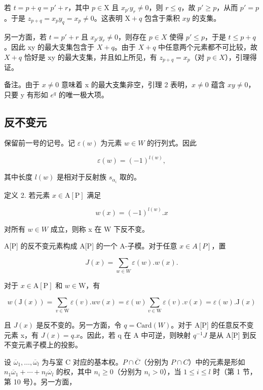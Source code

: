若 \(t = p + q = p' + r\)，其中 \(p \in \mathrm{X}\) 且 \(x_{p'}y_r \neq 0\)，则 \(r \leqslant q\)，故 \(p' \geqslant p\)，从而 \(p' = p\)。于是 \(z_{p + q} = x_p y_q = x_p \neq 0\)。这表明 \(\mathrm{X} + q\) 包含于乘积 \(xy\) 的支集。

另一方面，若 \(t = p' + r\) 且 \(x_{p'} y_r \neq 0\)，则存在 \(p \in X\) 使得 \(p' \leqslant p\)，于是 \(t \leqslant p + q\)。因此 xy 的最大支集包含于 \(X + q\)。由于 \(X + q\) 中任意两个元素都不可比较，故 \(X + q\) 恰好是 xy 的最大支集，并且如上所见，有 \(z_{p+q} = x_p\)（对 \(p \in X\)），引理得证。

备注。由于 \(x \neq 0\) 意味着 x 的最大支集非空，引理 2 表明，\(x \neq 0\) 蕴含 \(xy \neq 0\)，只要 y 有形如 \(e^{q}\) 的唯一极大项。

\subsection{反不变元}

保留前一号的记号。记 \(\varepsilon(w)\) 为元素 \(w \in W\) 的行列式。因此

\[
\varepsilon (w) = (- 1) ^ {l (w)},
\]

其中长度 \(l(w)\) 是相对于反射族 \(s_{\alpha_i}\) 取的。

定义 2. 若元素 \(x \in \mathrm{A}[\mathrm{P}]\) 满足

\[
w (x) = (- 1) ^ {l (w)}. x
\]

对所有 \(w \in W\) 成立，则称 x 在 W 下反不变。

A{[}P{]} 的反不变元素构成 A{[}P{]} 的一个 A-子模。对于任意 \(x \in A[P]\)，置

\[
J (x) = \sum_ {w \in W} \varepsilon (w). w (x).\tag{1}
\]

对于 \(x \in \mathrm{A}[\mathrm{P}]\) 和 \(w \in \mathrm{W}\)，有

\[
w (\mathrm{J} (x)) = \sum_ {v \in \mathrm{W}} \varepsilon (v). w v (x) = \varepsilon (w) \sum_ {v \in \mathrm{W}} \varepsilon (v). v (x) = \varepsilon (w). \mathrm{J} (x)
\]

且 \(J(x)\) 是反不变的。另一方面，令 \(q = \text{Card}(W)\)。对于 A{[}P{]} 的任意反不变元素 x，有 \(J(x) = q.x\)。因此，若 q 在 A 中可逆，则映射 \(q^{-1}J\) 是从 A{[}P{]} 到反不变元素子模上的投影。

设 \(\overline{\omega}_{1},\ldots,\overline{\omega}_{l}\) 为与室 C 对应的基本权。\(P\cap\overline{C}\)（分别为 \(P\cap C\)）中的元素是形如 \(n_{1}\overline{\omega}_{1}+\cdots+n_{l}\overline{\omega}_{l}\) 的权，其中 \(n_{i}\geqslant0\)（分别为 \(n_{i}>0\)），当 \(1\leqslant i\leqslant l\) 时（第 1 节，第 10 号）。另一方面，


